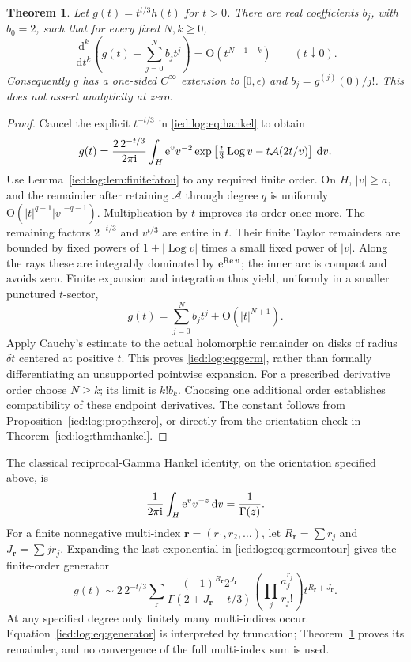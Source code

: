 \documentclass[11pt,letterpaper]{article}
\newtheorem{theorem}{Theorem}[section]
\theoremstyle{remark}\newtheorem{remark}[theorem]{Remark}
\newcommand{\ii}{\mathrm i}\newcommand{\dd}{\,\mathrm d}
\newcommand{\Oh}{\mathrm O}\newcommand{\supp}{\operatorname{supp}}
\newcommand{\Rea}{\operatorname{Re}}\newcommand{\Ima}{\operatorname{Im}}
\newcommand{\Log}{\operatorname{Log}}
\begin{document}
\begin{theorem}\label{ied:log:thm:germ}
Let $g(t)=t^{t/3}h(t)$ for $t>0$. There are real coefficients $b_j$, with $b_0=2$, such that for every fixed $N,k\ge0$,
\begin{equation}\label{ied:log:eq:germ}
 \frac{\dd^k}{\dd t^k}
 \left(g(t)-\sum_{j=0}^N b_jt^j\right)
       =\Oh(t^{N+1-k})\qquad(t\downarrow0).
\end{equation}
Consequently $g$ has a one-sided $C^\infty$ extension to $[0,\epsilon)$ and
$b_j=g^{(j)}(0)/j!$. This does not assert analyticity at zero.
\end{theorem}
\begin{proof}
Cancel the explicit $t^{-t/3}$ in \eqref{ied:log:eq:hankel} to obtain
\begin{equation}\label{ied:log:eq:germcontour}
 g(t)=\frac{2\,2^{-t/3}}{2\pi\ii}
 \int_H\e^vv^{-2}
 \exp\left[\tfrac t3\Log v-t\mathcal A(2t/v)\right]\dd v.
\end{equation}
Use Lemma~\ref{ied:log:lem:finitefatou} to any required finite order. On $H$, $|v|\ge a$, and the remainder after retaining $\mathcal A$ through degree $q$ is uniformly
$\Oh(|t|^{q+1}|v|^{-q-1})$. Multiplication by $t$ improves its order once more. The remaining factors $2^{-t/3}$ and $v^{t/3}$ are entire in $t$. Their finite Taylor remainders are bounded by fixed powers of $1+|\Log v|$ times a small fixed power of $|v|$. Along the rays these are integrably dominated by $\e^{\Rea v}$; the inner arc is compact and avoids zero. Finite expansion and integration thus yield, uniformly in a smaller punctured $t$-sector,
\[
 g(t)=\sum_{j=0}^N b_jt^j+\Oh(|t|^{N+1}).
\]
Apply Cauchy's estimate to the actual holomorphic remainder on disks of radius $\delta t$ centered at positive $t$. This proves \eqref{ied:log:eq:germ}, rather than formally differentiating an unsupported pointwise expansion. For a prescribed derivative order choose $N\ge k$; its limit is $k!b_k$. Choosing one additional order establishes compatibility of these endpoint derivatives. The constant follows from Proposition~\ref{ied:log:prop:hzero}, or directly from the orientation check in Theorem~\ref{ied:log:thm:hankel}.
\end{proof}

The classical reciprocal-Gamma Hankel identity, on the orientation specified above, is
\[
 \frac1{2\pi\ii}\int_H\e^vv^{-z}\dd v=\frac1{\Gamma(z)}.
\]
For a finite nonnegative multi-index $\mathbf r=(r_1,r_2,\ldots)$, let
$R_{\mathbf r}=\sum r_j$ and $J_{\mathbf r}=\sum jr_j$. Expanding the last exponential in \eqref{ied:log:eq:germcontour} gives the finite-order generator
\begin{equation}\label{ied:log:eq:generator}
 g(t)\sim2\,2^{-t/3}
 \sum_{\mathbf r}
 \frac{(-1)^{R_{\mathbf r}}2^{J_{\mathbf r}}}
      {\Gamma(2+J_{\mathbf r}-t/3)}
 \left(\prod_j\frac{a_j^{r_j}}{r_j!}\right)
 t^{R_{\mathbf r}+J_{\mathbf r}}.
\end{equation}
At any specified degree only finitely many multi-indices occur. Equation~\eqref{ied:log:eq:generator} is interpreted by truncation; Theorem~\ref{ied:log:thm:germ} proves its remainder, and no convergence of the full multi-index sum is used.
\end{document}
